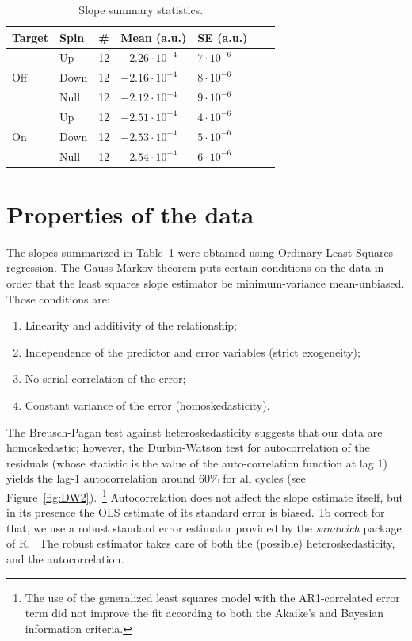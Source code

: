 \documentclass{article}
\begin{document}
\newcommand{\vp}[2]{#1\cdot10^{#2}}
\begin{table}[h]
	\centering
	\caption{Slope summary statistics.\label{tbl:SlpSumStat}}
	\begin{tabular}{lllllrr}
		\hline\hline
		       Target        & Spin & \# & Mean (a.u.)      & SE (a.u.)    \\ \hline
		\multirow{3}{*}{Off} & Up   & 12 & $\vp{-2.26}{-4}$ & $\vp{7}{-6}$ \\
		                     & Down & 12 & $\vp{-2.16}{-4}$ & $\vp{8}{-6}$ \\
		                     & Null & 12 & $\vp{-2.12}{-4}$ & $\vp{9}{-6}$ \\ \hline
		\multirow{3}{*}{On}  & Up   & 12 & $\vp{-2.51}{-4}$ & $\vp{4}{-6}$ \\
		                     & Down & 12 & $\vp{-2.53}{-4}$ & $\vp{5}{-6}$ \\
		                     & Null & 12 & $\vp{-2.54}{-4}$ & $\vp{6}{-6}$ \\ \hline
	\end{tabular}
\end{table}


\section{Properties of the data}
The slopes summarized in Table~\ref{tbl:SlpSumStat} were obtained using Ordinary Least Squares regression. 
The Gauss-Markov theorem puts certain conditions on the data in order that the least squares slope estimator be minimum-variance mean-unbiased. Those conditions are:~\cite{GaussMarkov}
\begin{enumerate}
	\item Linearity and additivity of the relationship;
	\item Independence of the predictor and error variables (strict exogeneity);
	\item No serial correlation of the error;
	\item Constant variance of the error (homoskedasticity).
\end{enumerate}

The Breusch-Pagan test against heteroskedasticity suggests that our data are homoskedastic; however, the Durbin-Watson test for autocorrelation of the residuals (whose statistic is the value of the auto-correlation function at lag 1) yields the lag-1 autocorrelation around 60\% for all cycles (see Figure~\ref{fig:DW2}).~\footnote{The use of the generalized least squares model with the AR1-correlated error term did not improve the fit according to both the Akaike's and Bayesian information criteria.} Autocorrelation does not affect the slope estimate itself, but in its presence the OLS estimate of its standard error is biased. To correct for that, we use a robust standard error estimator provided by the \emph{sandwich} package of R.~\cite{RSandwich} The robust estimator takes care of both the (possible) heteroskedasticity, and the autocorrelation. 
\end{document}
